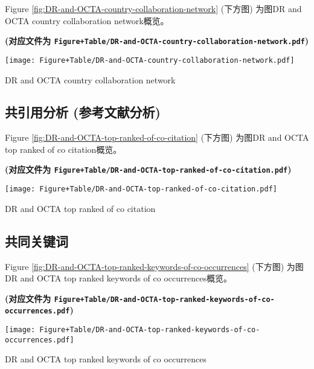 \documentclass[
]{article}
\begin{document}
Figure \ref{fig:DR-and-OCTA-country-collaboration-network} (下方图) 为图DR and OCTA country collaboration network概览。

\textbf{(对应文件为 \texttt{Figure+Table/DR-and-OCTA-country-collaboration-network.pdf})}

\def\@captype{figure}
\begin{center}
\texttt{[image: Figure+Table/DR-and-OCTA-country-collaboration-network.pdf]}
\caption{DR and OCTA country collaboration network}\label{fig:DR-and-OCTA-country-collaboration-network}
\end{center}

\hypertarget{ux5171ux5f15ux7528ux5206ux6790-ux53c2ux8003ux6587ux732eux5206ux6790}{%
\subsection{共引用分析 (参考文献分析)}\label{ux5171ux5f15ux7528ux5206ux6790-ux53c2ux8003ux6587ux732eux5206ux6790}}

Figure \ref{fig:DR-and-OCTA-top-ranked-of-co-citation} (下方图) 为图DR and OCTA top ranked of co citation概览。

\textbf{(对应文件为 \texttt{Figure+Table/DR-and-OCTA-top-ranked-of-co-citation.pdf})}

\def\@captype{figure}
\begin{center}
\texttt{[image: Figure+Table/DR-and-OCTA-top-ranked-of-co-citation.pdf]}
\caption{DR and OCTA top ranked of co citation}\label{fig:DR-and-OCTA-top-ranked-of-co-citation}
\end{center}

\hypertarget{ux5171ux540cux5173ux952eux8bcd}{%
\subsection{共同关键词}\label{ux5171ux540cux5173ux952eux8bcd}}

Figure \ref{fig:DR-and-OCTA-top-ranked-keywords-of-co-occurrences} (下方图) 为图DR and OCTA top ranked keywords of co occurrences概览。

\textbf{(对应文件为 \texttt{Figure+Table/DR-and-OCTA-top-ranked-keywords-of-co-occurrences.pdf})}

\def\@captype{figure}
\begin{center}
\texttt{[image: Figure+Table/DR-and-OCTA-top-ranked-keywords-of-co-occurrences.pdf]}
\caption{DR and OCTA top ranked keywords of co occurrences}\label{fig:DR-and-OCTA-top-ranked-keywords-of-co-occurrences}
\end{center}
\end{document}
